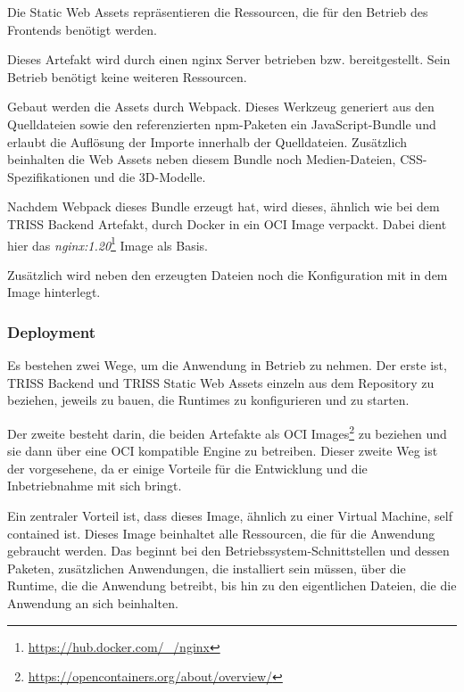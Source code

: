 
Die Static Web Assets repräsentieren die Ressourcen, die für den Betrieb des Frontends benötigt werden.


Dieses Artefakt wird durch einen nginx Server betrieben bzw. bereitgestellt.
Sein Betrieb benötigt keine weiteren Ressourcen.


Gebaut werden die Assets durch Webpack.
Dieses Werkzeug generiert aus den Quelldateien sowie den referenzierten npm-Paketen ein JavaScript-Bundle und erlaubt die Auflösung der Importe innerhalb der Quelldateien.
Zusätzlich beinhalten die Web Assets neben diesem Bundle noch Medien-Dateien, CSS-Spezifikationen und die 3D-Modelle.

Nachdem Webpack dieses Bundle erzeugt hat, wird dieses, ähnlich wie bei dem TRISS Backend Artefakt, durch Docker in ein OCI Image verpackt.
Dabei dient hier das \textit{nginx:1.20}\footnote{\url{https://hub.docker.com/_/nginx}} Image als Basis.

Zusätzlich wird neben den erzeugten Dateien noch die Konfiguration mit in dem Image hinterlegt.

\subsubsection{Deployment}

Es bestehen zwei Wege, um die Anwendung in Betrieb zu nehmen.
Der erste ist, TRISS Backend und TRISS Static Web Assets einzeln aus dem Repository zu beziehen, jeweils zu bauen, die Runtimes zu konfigurieren und zu starten.

Der zweite besteht darin, die beiden Artefakte als OCI Images\footnote{\url{https://opencontainers.org/about/overview/}} zu beziehen und sie dann über eine OCI kompatible Engine zu betreiben.
Dieser zweite Weg ist der vorgesehene, da er einige Vorteile für die Entwicklung und die Inbetriebnahme mit sich bringt.

Ein zentraler Vorteil ist, dass dieses Image, ähnlich zu einer Virtual Machine, self contained ist.
Dieses Image beinhaltet alle Ressourcen, die für die Anwendung gebraucht werden.
Das beginnt bei den Betriebssystem-Schnittstellen und dessen Paketen, zusätzlichen Anwendungen, die installiert sein müssen, über die Runtime, die die Anwendung betreibt, bis hin zu den eigentlichen Dateien, die die Anwendung an sich beinhalten.

